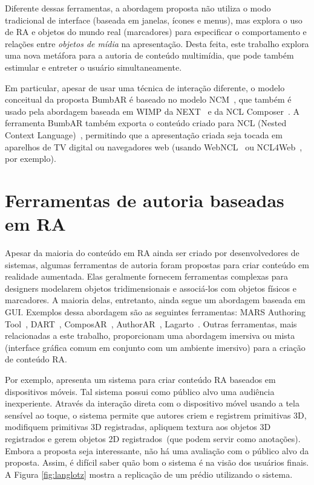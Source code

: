 \documentclass[../main.tex]{subfiles}
\begin{document}
Diferente dessas ferramentas, a abordagem proposta não utiliza o modo tradicional de interface (baseada em janelas, ícones e menus), mas explora o uso de RA e objetos do mundo real (marcadores) para especificar o comportamento e relações entre \emph{objetos de mídia} na apresentação. Desta feita, este trabalho explora uma nova metáfora para a autoria de conteúdo multimídia, que pode também estimular e entreter o usuário simultaneamente.

Em particular, apesar de usar uma técnica de interação diferente, o modelo conceitual da proposta BumbAR é baseado no modelo NCM~\cite{soares_nested_2005}, que também é usado pela abordagem baseada em WIMP da NEXT~\cite{paulo_de_mattos_next_2013} e da NCL Composer~\cite{azevedo_composer_2014}. A ferramenta BumbAR também exporta o conteúdo criado para NCL (Nested Context Language)~\cite{soares_programando_2009}, permitindo que a apresentação criada seja tocada em aparelhos de TV digital ou navegadores web (usando WebNCL~\cite{melo_webncl_2012} ou NCL4Web~\cite{silva_ncl4web_2013}, por exemplo).

\section{Ferramentas de autoria baseadas em RA}
\label{sec:ferramentas_ra}

Apesar da maioria do conteúdo em RA ainda ser criado por desenvolvedores de sistemas, algumas ferramentas de autoria foram propostas para criar conteúdo em realidade aumentada. Elas geralmente fornecem ferramentas complexas para designers modelarem objetos tridimensionais e associá-los com objetos físicos e marcadores. A maioria delas, entretanto, ainda segue um abordagem baseada em GUI. Exemplos dessa abordagem são as seguintes ferramentas: MARS Authoring Tool~\cite{sinem_authoring_2003}, DART~\cite{macintyre_dart_2004}, ComposAR~\cite{seichter_composar_2008}, AuthorAR~\cite{lucrecia_authorar_2013}, Lagarto~\cite{maia_lagarto_2017}. Outras ferramentas, mais relacionadas a este trabalho, proporcionam uma abordagem imersiva ou mista (interface gráfica comum em conjunto com um ambiente imersivo) para a criação de conteúdo RA.

Por exemplo,  apresenta um sistema para criar conteúdo RA baseados em dispositivos móveis. Tal sistema possui como público alvo uma audiência inexperiente. Através da interação direta com o dispositivo móvel usando a tela sensível ao toque, o sistema permite que autores criem e registrem primitivas 3D, modifiquem primitivas 3D registradas, apliquem textura aos objetos 3D registrados e gerem objetos 2D registrados~(que podem servir como anotações). Embora a proposta seja interessante, não há uma avaliação com o público alvo da proposta. Assim, é difícil saber quão bom o sistema é na visão dos usuários finais. A Figura \ref{fig:langlotz} mostra a replicação de um prédio utilizando o sistema. 
\end{document}
